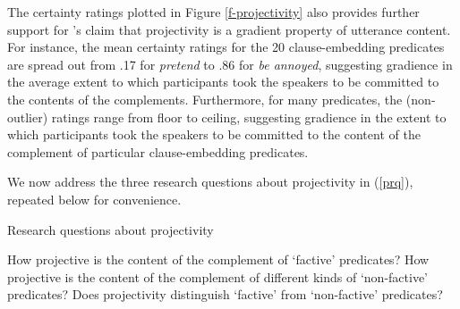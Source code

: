 \documentclass[11pt,fleqn]{article}
\newcommand{\6}{\mbox{$[\hspace*{-.6mm}[$}}
\newcommand{\9}{\mbox{$]\hspace*{-.6mm}]$}}
\newcommand{\citepos}[1]{\citeauthor{#1}'s \citeyear{#1}}
\begin{document}
The certainty ratings plotted in Figure \ref{f-projectivity} also provides further support for \citepos{tbd-variability} claim that projectivity is a gradient property of utterance content. For instance, the mean certainty ratings for the 20 clause-embedding predicates are spread out from .17 for {\em pretend} to .86 for {\em be annoyed}, suggesting gradience in the average extent to which participants took the speakers to be committed to the contents of the complements. Furthermore, for many predicates, the (non-outlier) ratings range from floor to ceiling, suggesting gradience in the extent to which participants took the speakers to be committed to the content of the complement of particular clause-embedding predicates. 

We now address the three research questions about projectivity in (\ref{prq}), repeated below for convenience. 

\begin{exe}
\exi{(\ref{prq})} Research questions about projectivity
\begin{xlist}
\ex How projective is the content of the complement of `factive' predicates?
\ex How projective is the content of the complement of different kinds of `non-factive' predicates?
\ex Does projectivity distinguish `factive' from `non-factive' predicates?
\end{xlist}
\end{exe}
\end{document}
